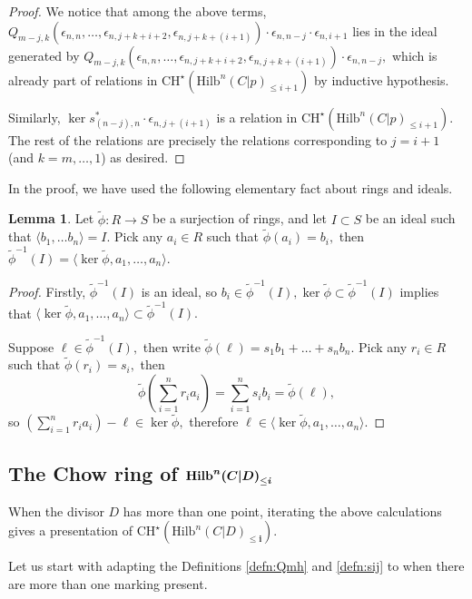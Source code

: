 \documentclass[10.5pt]{amsart}
\theoremstyle{definition}
\theoremstyle{definition}
\theoremstyle{definition}
\theoremstyle{definition}
\newtheorem{lemma}[theorem]{Lemma}
\newcommand{\Hilb}{\mathrm{Hilb}}
\newcommand{\bi}{\boldsymbol{i}}
\begin{document}
\begin{proof}
  We notice that among the above terms,  $Q_{m-j, k}(\epsilon_{n,n},\dots, \epsilon_{n, j+k+i+2}, \epsilon_{n, j+k+(i+1)}) \cdot \epsilon_{n,n-j} \cdot \epsilon_{n,i+1}$ lies in the ideal generated by $Q_{m-j, k}(\epsilon_{n,n},\dots, \epsilon_{n, j+k+i+2}, \epsilon_{n, j+k+(i+1)}) \cdot \epsilon_{n,n-j},$ which is already part of relations in $\mathrm{CH}^\star(\Hilb^n(C|p)_{\leq i+1})$ by inductive hypothesis.
  
  Similarly, $\ker s^*_{(n-j),n}\cdot \epsilon_{n,j+(i+1)}$ is a relation in $\mathrm{CH}^\star(\Hilb^n(C|p)_{\leq i+1}).$ The rest of the relations are precisely the relations corresponding to $j = i+1$ (and $k = m,\dots, 1$) as desired.
\end{proof}

In the proof, we have used the following elementary fact about rings and ideals.
\begin{lemma}\label{lem:rings}
  Let $\tilde{\phi}: R\to S$ be a surjection of rings, and let $I\subset S$ be an ideal such that $\langle b_1,\dots b_n\rangle = I.$ Pick any $a_i\in R$ such that $\tilde{\phi}(a_i) = b_i,$ then $\tilde{\phi}^{-1}(I) = \langle \ker \tilde{\phi}, a_1,\dots,a_n\rangle.$
\end{lemma}
\begin{proof}
  Firstly, $\tilde{\phi}^{-1}(I)$ is an ideal, so $b_i\in \tilde{\phi}^{-1}(I), \ker \tilde{\phi}\subset \tilde{\phi}^{-1}(I)$ implies that $\langle \ker \tilde{\phi}, a_1,\dots,a_n\rangle\subset \tilde{\phi}^{-1}(I).$

  Suppose $\ell \in \tilde{\phi}^{-1}(I),$ then write $\tilde{\phi}(\ell) = s_1 b_1 + \dots + s_nb_n.$ Pick any $r_i\in R$ such that $\tilde{\phi}(r_i) = s_i,$ then $$\tilde{\phi}(\sum_{i=1}^n r_i a_i) = \sum_{i=1}^n s_i b_i = \tilde{\phi}(\ell),$$ so $(\sum_{i=1}^n r_i a_i)-\ell\in \ker \tilde{\phi},$ therefore $\ell\in\langle  \ker \tilde{\phi},a_1,\dots, a_n\rangle.$
\end{proof}

\subsection{The Chow ring of $\textbf{\text{Hilb}}^{\boldsymbol{n}}{\boldsymbol{(C|D)}}_{\le \bi}$}

When the divisor $D$ has more than one point, iterating the above calculations gives a presentation of $\mathrm{CH}^\star(\Hilb^n(C|D)_{\leq \bi}).$

Let us start with adapting the Definitions \ref{defn:Qmh} and \ref{defn:sij} to when there are more than one marking present.
\end{document}
